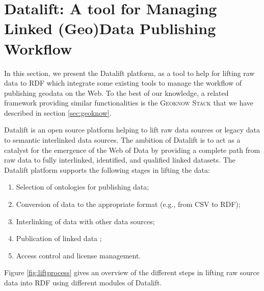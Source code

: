 \section{Datalift: A tool for Managing Linked (Geo)Data Publishing Workflow}
\label{sec:toolLD}
In this section, we present the Datalift platform, as a tool to help for lifting raw data to RDF which integrate some existing tools to manage the workflow of publishing geodata on the Web. To the best of our knowledge, a related framework providing similar functionalities is the \textsc{Geoknow Stack} that we have described in section \ref{sec:geoknow}.

Datalift is an open source platform \cite{scharffe_2012} helping to lift raw data sources or legacy data to semantic interlinked data sources.
The ambition of Datalift is to act as a catalyst for the emergence of the Web of Data by providing a complete path from raw data to fully interlinked, identified, and qualified linked datasets. The Datalift platform supports the following stages in lifting the data:
\begin{enumerate}
\item Selection of ontologies for publishing data;
\item Conversion of data to the appropriate format (e.g., from CSV to RDF);
\item Interlinking of data with other data sources;
\item Publication of linked data ;
\item Access control and license management.
\end{enumerate}

Figure \ref{fig:liftprocess} gives an overview of the different steps in lifting raw source data into RDF using different modules of Datalift.

\begin{figure}[!htp]
\end{figure}

